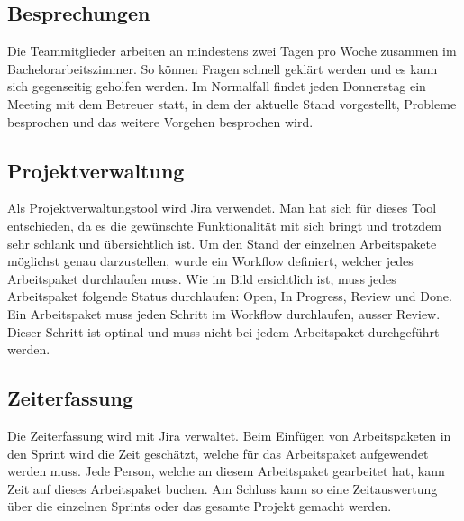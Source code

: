 \subsection{Besprechungen}
Die Teammitglieder arbeiten an mindestens zwei Tagen pro Woche zusammen im Bachelorarbeitszimmer. So können Fragen schnell geklärt werden und es kann sich gegenseitig geholfen werden. Im Normalfall findet jeden Donnerstag ein Meeting mit dem Betreuer statt, in dem der aktuelle Stand vorgestellt, Probleme besprochen und das weitere Vorgehen besprochen wird.

\subsection{Projektverwaltung}
Als Projektverwaltungstool wird Jira verwendet. Man hat sich für dieses Tool entschieden, da es die gewünschte Funktionalität mit sich bringt und trotzdem sehr schlank und übersichtlich ist. Um den Stand der einzelnen Arbeitspakete möglichst genau darzustellen, wurde ein Workflow definiert, welcher jedes Arbeitspaket durchlaufen muss.
Wie im Bild ersichtlich ist, muss jedes Arbeitspaket folgende Status durchlaufen: Open, In Progress, Review und Done. Ein Arbeitspaket muss jeden Schritt im Workflow durchlaufen, ausser Review. Dieser Schritt ist optinal und muss nicht bei jedem Arbeitspaket durchgeführt werden.

\subsection{Zeiterfassung}
Die Zeiterfassung wird mit Jira verwaltet. Beim Einfügen von Arbeitspaketen in den Sprint wird die Zeit geschätzt, welche für das Arbeitspaket aufgewendet werden muss. Jede Person, welche an diesem Arbeitspaket gearbeitet hat, kann Zeit auf dieses Arbeitspaket buchen. Am Schluss kann so eine Zeitauswertung über die einzelnen Sprints oder das gesamte Projekt gemacht werden.

\newpage